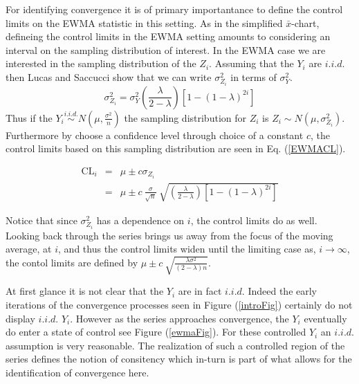 \documentclass[12pt]{article}
\begin{document}
%
%

%
For identifying convergence it is of primary importantance to define the control limits on the EWMA statistic in this setting.
%
As in the simplified $\bar x$-chart, defineing the control limits in the EWMA setting amounts to considering an interval on the sampling distribution of interest.
In the EWMA case we are interested in the sampling distribution of the $Z_i$.
Assuming that the $Y_i$ are $i.i.d.$ then Lucas and Saccucci \cite{ewmaPaper} show that we can write $\sigma^2_{Z_i}$ in terms of $\sigma^2_{Y}$. %
\begin{equation}
\sigma^2_{Z_i} = \sigma^2_{Y}\left(\frac{\lambda}{2-\lambda}\right)\left[1-(1-\lambda)^{2i}\right]
\end{equation}
Thus if the $Y_i \stackrel{i.i.d.}{\sim} N\left(\mu, \frac{\sigma^2}{n}\right)$ the sampling distribution for $Z_i$ is $Z_i \sim N\left(\mu, \sigma^2_{Z_i}\right)$.
%
Furthermore by choose a confidence level through choice of a constant $c$, the control limits based on this sampling distribution are seen in Eq. (\ref{EWMACL}).%
	
%
%
%
\begin{eqnarray}
\text{CL}_i &=& \mu \pm c \sigma_{Z_i}\nonumber\\
&=&  \mu \pm c ~ \frac{\sigma}{\sqrt{n}}~\sqrt{\left(\frac{\lambda}{2-\lambda}\right)\left[1-(1-\lambda)^{2i}\right]}
\label{EWMACL}
\end{eqnarray}
%
%

%
Notice that since $\sigma^2_{Z_i}$ has a dependence on $i$, the control limits do as well.
Looking back through the series brings us away from the focus of the moving average, at $i$, and thus the control limits widen until the limiting case as, $i\rightarrow\infty$, the contol limits are defined by $\mu \pm c ~ \sqrt{\frac{\lambda\sigma^2}{(2-\lambda)n}}$.

%
At first glance it is not clear that the $Y_i$ are in fact $i.i.d.$
%
Indeed the early iterations of the convergence processes seen in Figure (\ref{introFig}) certainly do not display $i.i.d.$ $Y_i$. 
%
However as the series approaches convergence, the $Y_i$ eventually do enter a state of control see Figure (\ref{ewmaFig}).
%
For these controlled $Y_i$ an $i.i.d.$ assumption is very reasonable.
%
The realization of such a controlled region of the series defines the notion of consitency which in-turn is part of what allows for the identification of convergence here. 
\end{document}
